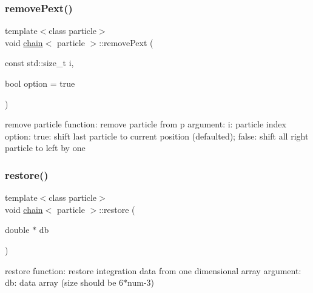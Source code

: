 \hypertarget{classchain_a3b80366fe18fc80159b4c5c5168d010c}{}\label{classchain_a3b80366fe18fc80159b4c5c5168d010c} 
\subsubsection{\texorpdfstring{remove\+Pext()}{removePext()}}
{\footnotesize\ttfamily template$<$class particle$>$ \\
void \hyperlink{classchain}{chain}$<$ particle $>$\+::remove\+Pext (\begin{DoxyParamCaption}\item[{const std\+::size\+\_\+t}]{i,  }\item[{bool}]{option = {\ttfamily true} }\end{DoxyParamCaption})\hspace{0.3cm}{\ttfamily [inline]}}



remove particle function\+: remove particle from p argument\+: i\+: particle index option\+: true\+: shift last particle to current position (defaulted); false\+: shift all right particle to left by one 

\hypertarget{classchain_a6450983197baedc6f5c8f0cb59702340}{}\label{classchain_a6450983197baedc6f5c8f0cb59702340} 
\subsubsection{\texorpdfstring{restore()}{restore()}}
{\footnotesize\ttfamily template$<$class particle$>$ \\
void \hyperlink{classchain}{chain}$<$ particle $>$\+::restore (\begin{DoxyParamCaption}\item[{double $\ast$}]{db }\end{DoxyParamCaption})\hspace{0.3cm}{\ttfamily [inline]}}



restore function\+: restore integration data from one dimensional array argument\+: db\+: data array (size should be 6$\ast$num-\/3) 

\hypertarget{classchain_a84a64c135620027cdc63cb1a72be6e37}{}\label{classchain_a84a64c135620027cdc63cb1a72be6e37} 
